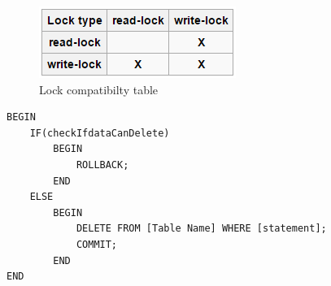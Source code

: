 \begin{figure}[H]
\centering
\includegraphics[width=0.4\linewidth]{figs/spm9/lockCompatibility.PNG}
\caption{Lock compatibilty table}
\label{fig:lockCompatibility}
\end{figure}

\begin{lstlisting}[caption=Eksemepl på Database transaction med DELETE]
BEGIN
	IF(checkIfdataCanDelete)
		BEGIN
			ROLLBACK;
		END
	ELSE
		BEGIN
			DELETE FROM [Table Name] WHERE [statement];
			COMMIT;
		END
END
\end{lstlisting}




